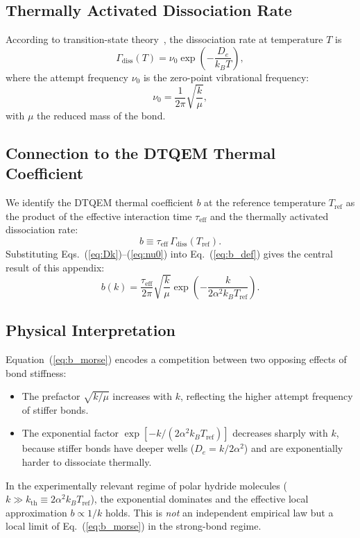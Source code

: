 \documentclass[reprint,amsmath,amssymb,aps,pra,superscriptaddress]{revtex4-2}
\begin{document}
\subsection{Thermally Activated Dissociation Rate}
According to transition-state theory~\cite{eyring1935}, the dissociation
rate at temperature $T$ is
\begin{equation}
\Gamma_{\text{diss}}(T)=\nu_0\exp\!\left(-\frac{D_e}{k_BT}\right),
\label{eq:arrhenius}
\end{equation}
where the attempt frequency $\nu_0$ is the zero-point vibrational frequency:
\begin{equation}
\nu_0=\frac{1}{2\pi}\sqrt{\frac{k}{\mu}},
\label{eq:nu0}
\end{equation}
with $\mu$ the reduced mass of the bond.

\subsection{Connection to the DTQEM Thermal Coefficient}
We identify the DTQEM thermal coefficient $b$ at the reference temperature
$T_{\text{ref}}$ as the product of the effective interaction time
$\tau_{\text{eff}}$ and the thermally activated dissociation rate:
\begin{equation}
b \equiv \tau_{\text{eff}}\,\Gamma_{\text{diss}}(T_{\text{ref}}).
\label{eq:b_def}
\end{equation}
Substituting Eqs.~(\ref{eq:Dk})--(\ref{eq:nu0}) into Eq.~(\ref{eq:b_def})
gives the central result of this appendix:
\begin{equation}
\boxed{
b(k)=\frac{\tau_{\text{eff}}}{2\pi}\sqrt{\frac{k}{\mu}}
\exp\!\left(-\frac{k}{2\alpha^2 k_BT_{\text{ref}}}\right).
}
\label{eq:b_morse}
\end{equation}

\subsection{Physical Interpretation}
Equation~(\ref{eq:b_morse}) encodes a competition between two opposing
effects of bond stiffness:
\begin{itemize}
\item The prefactor $\sqrt{k/\mu}$ increases with $k$, reflecting the higher
      attempt frequency of stiffer bonds.
\item The exponential factor $\exp[-k/(2\alpha^2k_BT_{\text{ref}})]$
      decreases sharply with $k$, because stiffer bonds have deeper wells
      ($D_e=k/2\alpha^2$) and are exponentially harder to dissociate
      thermally.
\end{itemize}
In the experimentally relevant regime of polar hydride molecules
($k\gg k_{\text{th}}\equiv 2\alpha^2 k_BT_{\text{ref}}$), the exponential
dominates and the effective local approximation $b\propto 1/k$ holds.
This is \emph{not} an independent empirical law but a local limit of
Eq.~(\ref{eq:b_morse}) in the strong-bond regime.
\end{document}
